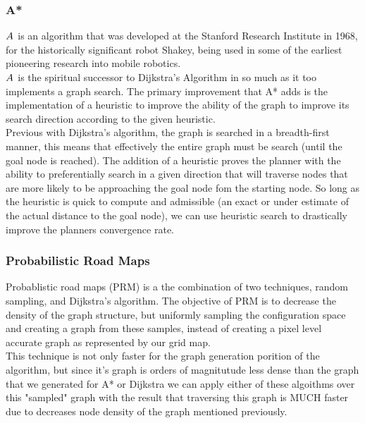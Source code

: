 \documentclass[journal]{IEEEtran}
\begin{document}
\subsubsection{A*}

$A^{\*}$ is an algorithm that was developed at the Stanford Research Institute in 1968, for the historically significant robot Shakey, being used in some of the earliest pioneering research into mobile robotics.\\


$A^{\*}$ is the spiritual successor to Dijkstra's Algorithm in so much as it too implements a graph search. The primary improvement that A* adds is the implementation of a heuristic to improve the ability of the graph to improve its search direction according to the given heuristic.\\ 

Previous with Dijkstra's algorithm, the graph is searched in a breadth-first manner, this means that effectively the entire graph must be search (until the goal node is reached). The addition of a heuristic proves the planner with the ability to preferentially search in a given direction that will traverse nodes that are more likely to be approaching the goal node fom the starting node. So long as the heuristic is quick to compute and admissible (an exact or under estimate of the actual distance to the goal node), we can use heuristic search to drastically improve the planners convergence rate. 


\subsubsection{Probabilistic Road Maps}

Probablistic road maps (PRM) is a the combination of two techniques, random sampling, and Dijkstra's algorithm. The objective of PRM is to decrease the density of the graph structure, but uniformly sampling the configuration space and creating a graph from these samples, instead of creating a pixel level accurate graph as represented by our grid map. \\

This technique is not only faster for the graph generation porition of the algorithm, but since it's graph is orders of magnitutude less dense than the graph that we generated for A* or Dijkstra we can apply either of these algoithms over this "sampled" graph with the result that traversing this graph is MUCH faster due to decreases node density of the graph mentioned previously.
\end{document}
